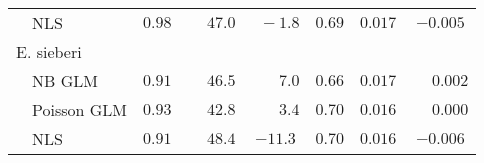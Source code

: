 \begin{tabular}{llcccccc}
 & NLS  & $0.98$ & $\phantom{-}47.0$ & $\phantom{0}-1.8$ & $0.69$ & $0.017$ & $-0.005$ \\
\multicolumn{2}{l}{E. sieberi} \\  & NB GLM  & $0.91$ & $\phantom{-}46.5$ & $\phantom{0}\phantom{-}7.0$ & $0.66$ & $0.017$ & $\phantom{-}0.002$ \\
 & Poisson GLM  & $0.93$ & $\phantom{-}42.8$ & $\phantom{0}\phantom{-}3.4$ & $0.70$ & $0.016$ & $\phantom{-}0.000$ \\
 & NLS  & $0.91$ & $\phantom{-}48.4$ & $-11.3$ & $0.70$ & $0.016$ & $-0.006$ \\
\bottomrule 
\end{tabular}
